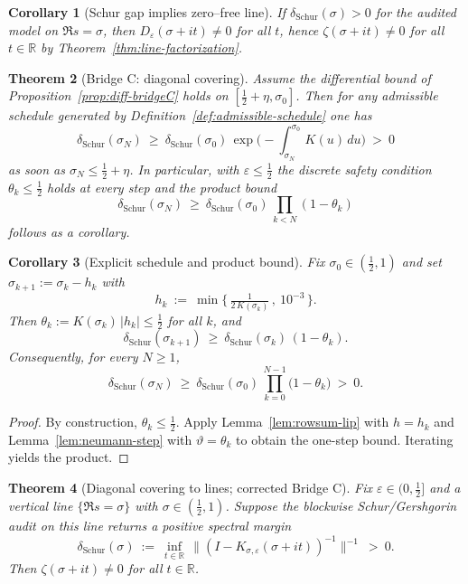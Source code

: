 \documentclass[11pt]{article}
\newtheorem{theorem}{Theorem}
\newtheorem{corollary}[theorem]{Corollary}
\theoremstyle{definition}
\theoremstyle{remark}
\newcommand{\R}{\mathbb{R}}
\begin{document}
\begin{corollary}[Schur gap implies zero--free line]\label{cor:line-zerofree}
If $\delta_{\mathrm{Schur}}(\sigma)>0$ for the audited model on $\Re s=\sigma$, then $D_\varepsilon(\sigma+it)\ne 0$ for all $t$, hence $\zeta(\sigma+it)\ne 0$ for all $t\in\R$ by Theorem~\ref{thm:line-factorization}.
\end{corollary}

\begin{theorem}[Bridge C: diagonal covering]\label{thm:bridge-C}
Assume the differential bound of Proposition~\ref{prop:diff-bridgeC} holds on $[\tfrac12+\eta,\sigma_0]$. Then for any admissible schedule generated by Definition~\ref{def:admissible-schedule} one has
\[
  \delta_{\mathrm{Schur}}(\sigma_N)\ \ge\ \delta_{\mathrm{Schur}}(\sigma_0)\,\exp\!\Big(-\int_{\sigma_N}^{\sigma_0}K(u)\,du\Big)\ >\ 0
\]
as soon as $\sigma_N\le \tfrac12+\eta$. In particular, with $\varepsilon\le \tfrac12$ the discrete safety condition $\theta_k\le \tfrac12$ holds at every step and the product bound
\[
  \delta_{\mathrm{Schur}}(\sigma_N)\ \ge\ \delta_{\mathrm{Schur}}(\sigma_0)\,\prod_{k< N}(1-\theta_k)
\]
follows as a corollary.
\end{theorem}

\begin{corollary}[Explicit schedule and product bound]\label{cor:explicit-schedule}
Fix $\sigma_0\in(\tfrac12,1)$ and set $\sigma_{k+1}:=\sigma_k-h_k$ with
\[
  h_k\ :=\ \min\Big\{\, \tfrac{1}{2\,K(\sigma_k)}\,,\ 10^{-3}\,\Big\}.
\]
Then $\theta_k:=K(\sigma_k)\,|h_k|\le \tfrac12$ for all $k$, and
\[
  \delta_{\mathrm{Schur}}(\sigma_{k+1})\ \ge\ \delta_{\mathrm{Schur}}(\sigma_k)\,(1-\theta_k).
\]
Consequently, for every $N\ge 1$,
\[
  \delta_{\mathrm{Schur}}(\sigma_{N})\ \ge\ \delta_{\mathrm{Schur}}(\sigma_0)\,\prod_{k=0}^{N-1}\big(1-\theta_k\big)\ >\ 0.
\]
\end{corollary}

\begin{proof}
By construction, $\theta_k\le \tfrac12$. Apply Lemma~\ref{lem:rowsum-lip} with $h=h_k$ and Lemma~\ref{lem:neumann-step} with $\vartheta=\theta_k$ to obtain the one-step bound. Iterating yields the product.
\end{proof}

\begin{theorem}[Diagonal covering to lines; corrected Bridge C]\label{thm:diag-cover-corrected}
Fix $\varepsilon\in(0,\tfrac12]$ and a vertical line $\{\Re s=\sigma\}$ with $\sigma\in(\tfrac12,1)$. Suppose the blockwise Schur/Gershgorin audit on this line returns a positive spectral margin 
\[
\delta_{\mathrm{Schur}}(\sigma)\ :=\ \inf_{t\in\mathbb{R}}\,\big\| (I-K_{\sigma,\varepsilon}(\sigma+it))^{-1}\big\|^{-1}\ >\ 0.
\]
Then $\zeta(\sigma+it)\neq 0$ for all $t\in\R$.
\end{theorem}
\end{document}
